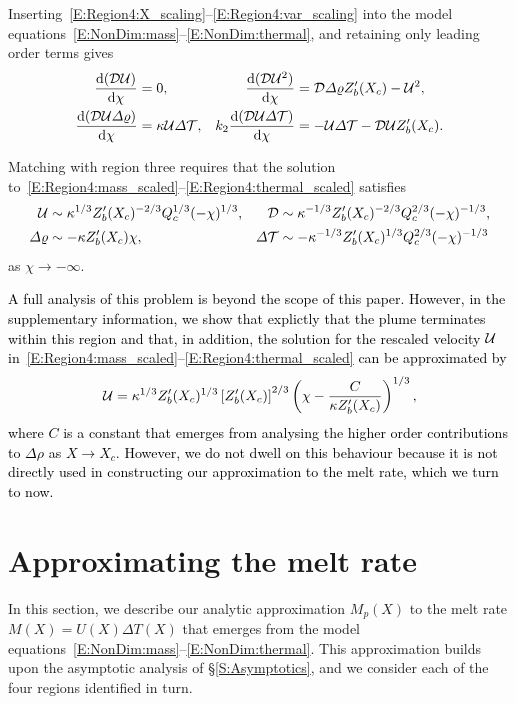 \documentclass[openacc]{rsproca_new}%
\newcommand{\dd}[2]{\frac{\mathrm{d} #1}{\mathrm{d} #2}}
\newcommand{\blue}[1]{{\color{blue} #1}}
\renewcommand{\blue}[1]{{\textcolor{black}{#1}}} %
\begin{document}
Inserting~\eqref{E:Region4:X_scaling}--\eqref{E:Region4:var_scaling} into the model equations~\eqref{E:NonDim:mass}--\eqref{E:NonDim:thermal}, and retaining only leading order terms gives
\begin{align}
\dd{(\D\U)}{\chi} &=0, &
\dd{(\D \U^2)}{\chi} &=  \D \p Z_b'(X_c) -\U^2,\label{E:Region4:mass_scaled}\\
\dd{(\D\U\p)}{\chi} &=\kappa  \U\t, &
k_2 \dd{(\D \U \t)}{\chi} &=- \U \t - \D \U Z_b'(X_c).\label{E:Region4:thermal_scaled}
\end{align}


Matching with region three requires that the solution to~\eqref{E:Region4:mass_scaled}--\eqref{E:Region4:thermal_scaled} satisfies
\begin{align}
\mathcal{U} &\sim \kappa^{1/3}Z_b'(X_c)^{-2/3}Q_c^{1/3} (-\chi)^{1/3}, &  \mathcal{D} &\sim \kappa^{-1/3} Z_b'(X_c)^{-2/3} Q_c^{2/3}(-\chi)^{-1/3}\label{E:Region4:far_field1},\\
\varDelta \varrho &\sim - \kappa Z_b'(X_c) \chi, & \varDelta \mathcal{T} &\sim -\kappa^{-1/3} Z_b'(X_c)^{1/3} Q_c^{2/3}(-\chi)^{-1/3}\label{E:Region4:far_field2}
\end{align}
as $\chi \to -\infty$. 

\blue{A full analysis of this problem is beyond the scope of this paper. However, in the supplementary information, we show that explictly that the plume terminates within this region and that, in addition, the solution for the rescaled velocity $\mathcal{U}$ in~\eqref{E:Region4:mass_scaled}--\eqref{E:Region4:thermal_scaled} can be approximated by} 
\begin{equation}
     \mathcal{U} =  \kappa^{1/3}Z_b'(X_c)^{1/3}\left[Z_b'(X_c)\right]^{2/3} \left(\chi - \frac{C}{\kappa Z_b'(X_c)}\right)^{1/3},
\end{equation}
\blue{where $C$ is a constant that emerges from analysing the higher order contributions to $\Delta \rho$ as $X \to X_c$. However, we do not dwell on this behaviour because it is not directly used in constructing our approximation to the melt rate, which we turn to now.}

\section{Approximating the melt rate}\label{S:MeltRate}
In this section, we describe our analytic approximation $M_p(X)$ to the melt rate $M(X) = U(X)\Delta T(X)$ that emerges from the model equations~\eqref{E:NonDim:mass}--\eqref{E:NonDim:thermal}. This approximation builds upon the asymptotic analysis of \S\ref{S:Asymptotics}, and we consider each of the four regions identified in turn. 
\end{document}
